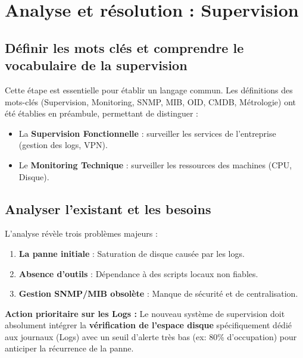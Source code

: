 \newpage

\section*{Analyse et résolution : Supervision}

\subsection*{Définir les mots clés et comprendre le vocabulaire de la supervision}
{}

\noindent Cette étape est essentielle pour établir un langage commun. Les définitions des mots-clés (Supervision, Monitoring, SNMP, MIB, OID, CMDB, Métrologie) ont été établies en préambule, permettant de distinguer :
\begin{itemize}
    \item La \textbf{Supervision Fonctionnelle} : surveiller les services de l'entreprise (gestion des logs, VPN).
    \item Le \textbf{Monitoring Technique} : surveiller les ressources des machines (CPU, Disque).
\end{itemize}

\subsection*{Analyser l'existant et les besoins}
{}

\noindent L'analyse révèle trois problèmes majeurs :
\begin{enumerate}
    \item \textbf{La panne initiale} : Saturation de disque causée par les logs.
    \item \textbf{Absence d'outils} : Dépendance à des scripts locaux non fiables.
    \item \textbf{Gestion SNMP/MIB obsolète} : Manque de sécurité et de centralisation.
\end{enumerate}
\vspace{0.5em}
\noindent \textbf{Action prioritaire sur les Logs :} Le nouveau système de supervision doit absolument intégrer la \textbf{vérification de l'espace disque} spécifiquement dédié aux journaux (Logs) avec un seuil d'alerte très bas (ex: 80\% d'occupation) pour anticiper la récurrence de la panne.

